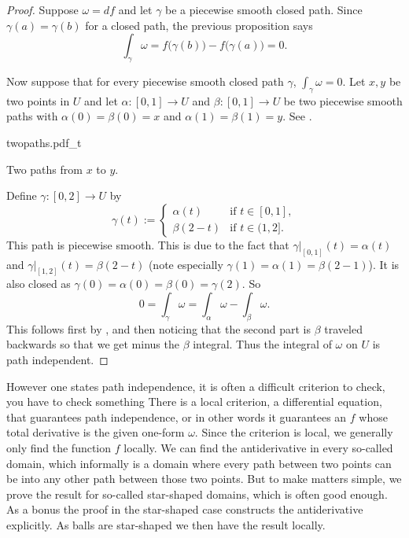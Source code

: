 \begin{proof}
Suppose $\omega = df$ and let $\gamma$ be a piecewise smooth
closed path.  
Since $\gamma(a) = \gamma(b)$ for a closed path,
the previous proposition says
\begin{equation*}
\int_{\gamma} \omega = f\bigl(\gamma(b)\bigr) - f\bigl(\gamma(a)\bigr) = 0 .
\end{equation*}

Now suppose that for every piecewise smooth closed path $\gamma$, $\int_{\gamma} \omega = 0$.
Let $x,y$ be two points in $U$ and let $\alpha \colon [0,1] \to U$ and
$\beta \colon [0,1] \to U$ be two piecewise smooth paths with $\alpha(0) = \beta(0) = x$
and $\alpha(1) = \beta(1) = y$.  See .
\begin{myfigureht}
{twopaths.pdf_t}
\caption{Two paths from $x$ to $y$.\label{fig:twopaths}}
\end{myfigureht}

Define $\gamma \colon [0,2] \to U$ by
\begin{equation*}
\gamma(t) :=
\begin{cases}
\alpha(t)  & \text{if } t \in [0,1], \\
\beta(2-t) & \text{if } t \in (1,2].
\end{cases}
\end{equation*}
This path is piecewise smooth.  This is due to the fact that
$\gamma|_{[0,1]}(t) = \alpha(t)$ and
$\gamma|_{[1,2]}(t) = \beta(2-t)$ (note especially $\gamma(1) = \alpha(1) =
\beta(2-1)$).
It is also closed as $\gamma(0) = \alpha(0) = \beta(0) = \gamma(2)$.
So 
\begin{equation*}
0 = \int_{\gamma} \omega = \int_{\alpha} \omega - \int_{\beta} \omega .
\end{equation*}
This follows first by , and then noticing that
the second part is $\beta$ traveled backwards so that we get minus the
$\beta$ integral.  Thus the integral of $\omega$ on $U$ is path independent.
\end{proof}

However one states path independence, it is often a difficult criterion to
check, you have to check something 
There is a local criterion, a differential equation, that guarantees
path independence, or in other words it guarantees an
\emph{}
$f$ whose total derivative is the given one-form
$\omega$.  Since the criterion is local, we generally only find the
function $f$ locally.
We can find the antiderivative in every so-called
\emph{} domain, which informally is a domain where
every path between two points can be 
into any other path
between those two points.  But to make matters simple, we prove
the result for so-called star-shaped domains, which is often good enough.
As a bonus the proof in the star-shaped case constructs
the antiderivative explicitly.
As balls are star-shaped we then have the result locally.

